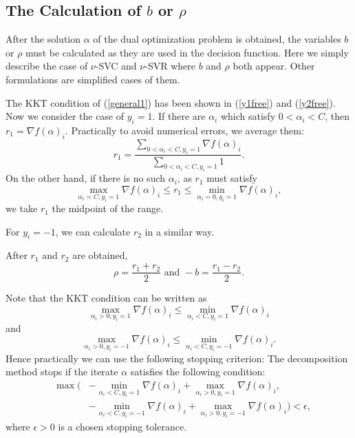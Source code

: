 \documentclass[11pt]{article}
\theoremstyle{break}
\begin{document}
\subsection{The Calculation of 
$b$ or $\rho$}
\label{bandrho}

After the solution $\alpha$ of
the dual optimization problem is obtained,
the variables $b$ or $\rho$
must be calculated as they are used
in the decision function.
Here we simply describe the
case of $\nu$-SVC and
$\nu$-SVR where 
$b$ and $\rho$ both appear.
Other formulations are simplified
cases of them.

The KKT condition
of (\ref{general1}) has been shown in 
(\ref{y1free})
and 
(\ref{y2free}). Now we consider the case
of $y_i = 1$.
If there are $\alpha_i$ 
which  satisfy 
$0 < \alpha_i < C$,
then
$r_1 = \nabla f(\alpha)_i$.
Practically to avoid numerical errors,
we average them:
\begin{equation*}
  r_1 = 
\frac{\sum_{0 < \alpha_i < C, y_i = 1}
\nabla f(\alpha)_i }
{\sum_{0 < \alpha_i < C, y_i = 1} 1}.
\end{equation*}
On the other hand, if there is no such
$\alpha_i$,
as $r_1$ must satisfy
\begin{equation*}
\max_{\alpha_i = C, y_i = 1} \nabla f(\alpha)_i
\leq 
r_1 \leq \min_{\alpha_i = 0, y_i = 1} 
\nabla f(\alpha)_i ,
\end{equation*}
we take $r_1$ the midpoint of the range.

For $y_i = -1$, we can calculate $r_2$
in a similar way.

After $r_1$ and $r_2$ are obtained, 
\begin{equation*}
  \rho = \frac{r_1 + r_2}{2}
\mbox{ and }
-b = \frac{r_1 - r_2}{2}.
\end{equation*}

Note that the KKT condition can be written as
\begin{equation*}
\max_{\alpha_i >0, y_i = 1} \nabla f(\alpha)_i
\leq 
\min_{\alpha_i <C, y_i = 1} 
\nabla f(\alpha)_i 
  \end{equation*}
and
\begin{equation*}
\max_{\alpha_i >0, y_i = -1} 
\nabla f(\alpha)_i
\leq 
\min_{\alpha_i <C, y_i = -1} 
\nabla f(\alpha)_i.
\end{equation*}
Hence practically we can use
the following stopping criterion:
The decomposition method
stops if the iterate $\alpha$
satisfies the following condition:
\begin{eqnarray}
& \max( &
-\min_{\alpha_i <C, y_i = 1} 
\nabla f(\alpha)_i 
+
\max_{\alpha_i >0, y_i = 1} \nabla f(\alpha)_i, \\
\label{nustop}
&& -\min_{\alpha_i <C, y_i = -1} 
\nabla f(\alpha)_i
+
\max_{\alpha_i >0, y_i = -1} 
\nabla f(\alpha)_i
)
< \epsilon,
\end{eqnarray}
where $\epsilon>0$ is a chosen
stopping tolerance.
\end{document}
